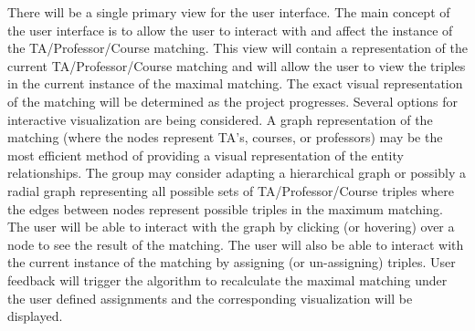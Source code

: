There will be a single primary view for the user interface. The main concept of the user interface is to allow the user to interact with and affect the instance of the TA/Professor/Course matching. This view will contain a representation of the current TA/Professor/Course matching and will allow the user to view the triples in the current instance of the maximal matching. The exact visual representation of the matching will be determined as the project progresses. Several options for interactive visualization are being considered. A graph representation of the matching (where the nodes represent TA's, courses, or professors) may be the most efficient method of providing a visual representation of the entity relationships. The group may consider adapting a hierarchical graph or possibly a radial graph representing all possible sets of TA/Professor/Course triples where the edges between nodes represent possible triples in the maximum matching. The user will be able to interact with the graph by clicking (or hovering) over a node to see the result of the matching. The user will also be able to interact with the current instance of the matching by assigning (or un-assigning) triples. User feedback will trigger the algorithm to recalculate the maximal matching under the user defined assignments and the corresponding visualization will be displayed.  
